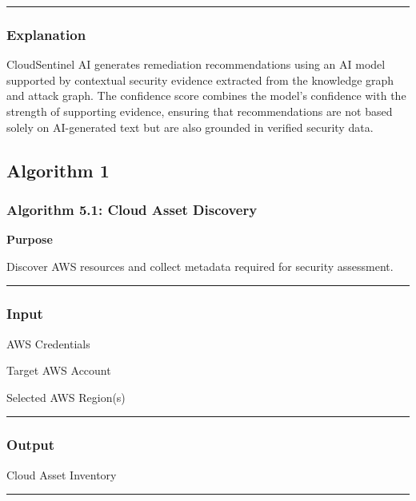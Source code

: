 \begin{center}\rule{0.5\linewidth}{0.5pt}\end{center}

\subsubsection{Explanation}

CloudSentinel AI generates remediation recommendations using an AI model supported by contextual security evidence extracted from the knowledge graph and attack graph. The confidence score combines the model's confidence with the strength of supporting evidence, ensuring that recommendations are not based solely on AI-generated text but are also grounded in verified security data.

\subsection{Algorithm 1}

\subsubsection{Algorithm 5.1: Cloud Asset Discovery}

\textbf{Purpose}

Discover AWS resources and collect metadata required for security assessment.

\begin{center}\rule{0.5\linewidth}{0.5pt}\end{center}

\subsubsection{\texorpdfstring{\textbf{Input}}{Input}}

AWS Credentials

Target AWS Account

Selected AWS Region(s)

\begin{center}\rule{0.5\linewidth}{0.5pt}\end{center}

\subsubsection{\texorpdfstring{\textbf{Output}}{Output}}

Cloud Asset Inventory

\begin{center}\rule{0.5\linewidth}{0.5pt}\end{center}

